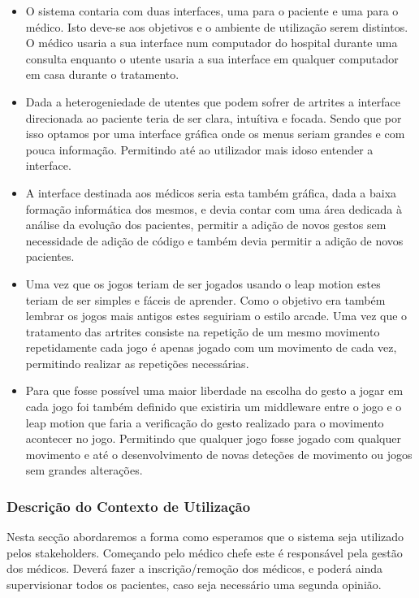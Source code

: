 \documentclass{TTUPhD}
\begin{document}
\begin{itemize}
    \item O sistema contaria com duas interfaces, uma para o paciente e uma para o médico.
          Isto deve-se aos objetivos e o ambiente de utilização serem distintos.
          O médico usaria a sua interface num computador do hospital
          durante uma consulta enquanto o utente usaria a sua interface em qualquer computador em casa durante o tratamento.
    \item Dada a heterogeniedade de utentes que podem sofrer de artrites a interface direcionada ao paciente teria de ser clara,
          intuítiva e focada. Sendo que por isso optamos por uma interface gráfica onde os menus seriam grandes e com pouca informação.
          Permitindo até ao utilizador mais idoso entender a interface.
    \item A interface destinada aos médicos seria esta também gráfica, dada a baixa formação informática dos mesmos,
          e devia contar com uma área dedicada à análise da evolução dos pacientes, permitir a adição de novos gestos
          sem necessidade de adição de código e também devia permitir a adição de novos pacientes.
    \item Uma vez que os jogos teriam de ser jogados usando o leap motion estes teriam de ser simples e fáceis de aprender.
          Como o objetivo era também lembrar os jogos mais antigos estes seguiriam o estilo arcade. Uma vez que o tratamento das
          artrites consiste na repetição de um mesmo movimento repetidamente cada jogo é apenas jogado com um movimento de cada vez,
          permitindo realizar as repetições necessárias.
    \item Para que fosse possível uma maior liberdade na escolha do gesto a jogar em cada jogo foi também definido que existiria um
          middleware entre o jogo e o leap motion que faria a verificação do gesto realizado para o movimento acontecer no jogo.
          Permitindo que qualquer jogo fosse jogado com qualquer movimento e até o desenvolvimento de novas deteções de movimento ou jogos sem grandes alterações.
\end{itemize}

\subsubsection{Descrição do Contexto de Utilização}

Nesta secção abordaremos a forma como esperamos que o sistema seja utilizado pelos stakeholders.
Começando pelo médico chefe este é responsável pela gestão dos médicos.
Deverá fazer a inscrição/remoção dos médicos, e poderá ainda supervisionar todos os pacientes, caso seja necessário uma segunda opinião.
\end{document}
